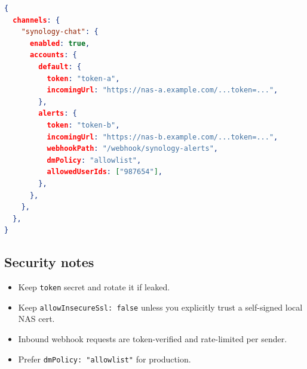 \begin{lstlisting}[language=json]
{
  channels: {
    "synology-chat": {
      enabled: true,
      accounts: {
        default: {
          token: "token-a",
          incomingUrl: "https://nas-a.example.com/...token=...",
        },
        alerts: {
          token: "token-b",
          incomingUrl: "https://nas-b.example.com/...token=...",
          webhookPath: "/webhook/synology-alerts",
          dmPolicy: "allowlist",
          allowedUserIds: ["987654"],
        },
      },
    },
  },
}
\end{lstlisting}


\subsection{Security notes}


\begin{itemize}
  \item Keep \texttt{token} secret and rotate it if leaked.
  \item Keep \texttt{allowInsecureSsl: false} unless you explicitly trust a self-signed local NAS cert.
  \item Inbound webhook requests are token-verified and rate-limited per sender.
  \item Prefer \texttt{dmPolicy: "allowlist"} for production.
\end{itemize}



\clearpage

